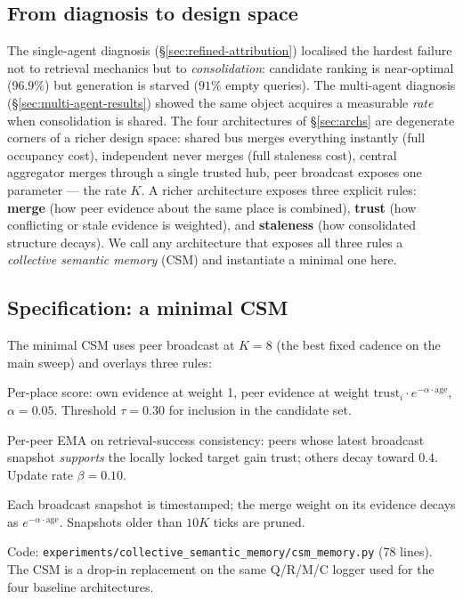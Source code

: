 \documentclass{article}
\begin{document}
\subsection{From diagnosis to design space}
The single-agent diagnosis (\S\ref{sec:refined-attribution}) localised the hardest failure not to retrieval mechanics but to \emph{consolidation}: candidate ranking is near-optimal ($96.9\%$) but generation is starved ($91\%$ empty queries). The multi-agent diagnosis (\S\ref{sec:multi-agent-results}) showed the same object acquires a measurable \emph{rate} when consolidation is shared. The four architectures of \S\ref{sec:archs} are degenerate corners of a richer design space: shared bus merges everything instantly (full occupancy cost), independent never merges (full staleness cost), central aggregator merges through a single trusted hub, peer broadcast exposes one parameter --- the rate $K$. A richer architecture exposes three explicit rules: \textbf{merge} (how peer evidence about the same place is combined), \textbf{trust} (how conflicting or stale evidence is weighted), and \textbf{staleness} (how consolidated structure decays). We call any architecture that exposes all three rules a \emph{collective semantic memory} (CSM) and instantiate a minimal one here.

\subsection{Specification: a minimal CSM}
The minimal CSM uses peer broadcast at $K{=}8$ (the best fixed cadence on the main sweep) and overlays three rules:
\begin{description}[leftmargin=14pt,itemsep=1pt,topsep=2pt]
\item[\textit{Merge.}] Per-place score: own evidence at weight 1, peer evidence at weight $\mathrm{trust}_i \cdot e^{-\alpha \cdot \mathrm{age}}$, $\alpha = 0.05$. Threshold $\tau = 0.30$ for inclusion in the candidate set.
\item[\textit{Trust.}] Per-peer EMA on retrieval-success consistency: peers whose latest broadcast snapshot \emph{supports} the locally locked target gain trust; others decay toward $0.4$. Update rate $\beta = 0.10$.
\item[\textit{Staleness.}] Each broadcast snapshot is timestamped; the merge weight on its evidence decays as $e^{-\alpha\cdot\mathrm{age}}$. Snapshots older than $10K$ ticks are pruned.
\end{description}

Code: \texttt{experiments/collective\_semantic\_memory/csm\_memory.py} (78 lines). The CSM is a drop-in replacement on the same Q/R/M/C logger used for the four baseline architectures.
\end{document}
